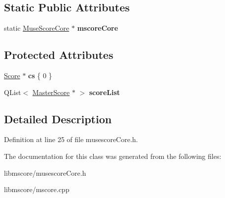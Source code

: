 \subsection*{Static Public Attributes}
\begin{DoxyCompactItemize}
\item 
\mbox{\label{class_ms_1_1_muse_score_core_a9c8d01239eeec66089524eb9ae5c0376}} 
static \hyperlink{class_ms_1_1_muse_score_core}{Muse\+Score\+Core} $\ast$ {\bfseries mscore\+Core}
\end{DoxyCompactItemize}
\subsection*{Protected Attributes}
\begin{DoxyCompactItemize}
\item 
\mbox{\label{class_ms_1_1_muse_score_core_a22c70e9cc6b52d2928bb0b5a438a8bcf}} 
\hyperlink{class_ms_1_1_score}{Score} $\ast$ {\bfseries cs} \{ 0 \}
\item 
\mbox{\label{class_ms_1_1_muse_score_core_a6aea8ca9530bf743e4a8c24b1036d837}} 
Q\+List$<$ \hyperlink{class_ms_1_1_master_score}{Master\+Score} $\ast$ $>$ {\bfseries score\+List}
\end{DoxyCompactItemize}


\subsection{Detailed Description}


Definition at line 25 of file musescore\+Core.\+h.



The documentation for this class was generated from the following files\+:\begin{DoxyCompactItemize}
\item 
libmscore/musescore\+Core.\+h\item 
libmscore/mscore.\+cpp\end{DoxyCompactItemize}
